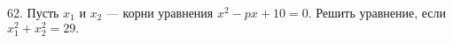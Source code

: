 62. Пусть $x_1$ и $x_2$ --- корни уравнения $x^2-px+10=0.$ Решить уравнение, если $x_1^2+x_2^2=29.$\\
